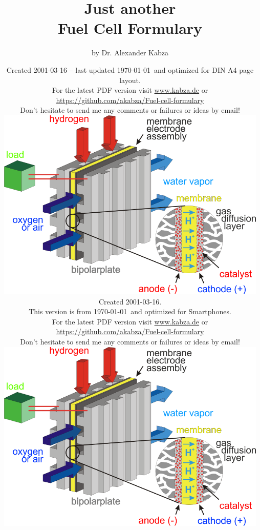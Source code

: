 \documentclass[11pt,a4paper,english,twoside]{scrreprt}
\begin{document}

\title{\Large Just another \\[.75cm] 
  \Huge Fuel Cell Formulary}
\author{\Large by Dr. Alexander Kabza}
\begin{A4}
  \date{
    \scriptsize Created 2001-03-16 -- last updated \today\ and optimized for DIN A4 page layout.
    \\[.3cm] 
    For the latest PDF version visit  \url{www.kabza.de} or
    \url{https://github.com/akabza/Fuel-cell-formulary}
    \\[.3cm]
    Don't hesitate to send me any comments or failures or ideas by email!
    \\[2cm]
    \includegraphics[width=13cm]{PEMFC_EN_small.png}
  }
\end{A4}  
\begin{Smartphone}
  \date{
    \scriptsize Created 2001-03-16.
    \\[.3cm]
    This version is from \today\ and optimized for Smartphones.
    \\[.3cm] 
    For the latest PDF version visit \url{www.kabza.de} or
    \url{https://github.com/akabza/Fuel-cell-formulary}
    \\[.3cm]
    Don't hesitate to send me any comments or failures or ideas by email!
    \\[2cm]
    \includegraphics[width=13cm]{PEMFC_EN_small.png}
  }
\end{Smartphone} 
 
\end{document}
